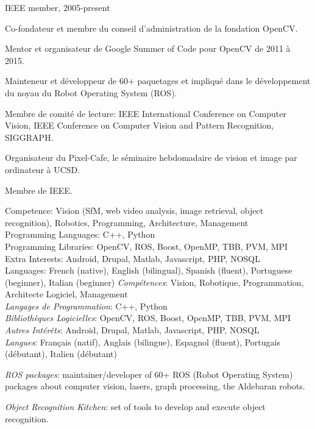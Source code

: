 \documentclass{article}
\begin{document}
\begin{llist}
{IEEE member, 2005-present
}
{

Co-fondateur et membre du conseil d'administration de la fondation OpenCV.

Mentor et organisateur de Google Summer of Code pour OpenCV de 2011 \`{a} 2015.

Mainteneur et d\'{e}veloppeur de 60+ paquetages et impliqu\'{e} dans le d\'{e}veloppement du
noyau du Robot Operating System (ROS).

Membre de comit\'{e} de lecture: IEEE International Conference on Computer Vision, IEEE Conference on Computer Vision 
and Pattern Recognition, SIGGRAPH.

Organisateur du Pixel-Cafe, le s\'{e}minaire hebdomadaire de vision et image par ordinateur \`{a} UCSD.

Membre de IEEE.
}

{
Competence: Vision (SfM, web video analysis, image retrieval, object recognition), Robotics, Programming, Architecture, 
Management \\
Programming Languages: C++, Python\\
Programming Libraries: OpenCV, ROS, Boost, OpenMP, TBB, PVM, MPI \\
Extra Interests: Android, Drupal, Matlab, Javascript, PHP, NOSQL \\
Languages: French (native), English (bilingual), Spanish (fluent), Portuguese (beginner), Italian (beginner)
}
{
{\em Comp\'{e}tences}: Vision, Robotique, Programmation, Architecte Logiciel, Management\\
{\em Langages de Programmation}: C++, Python\\
{\em Biblioth\`{e}ques Logicielles}: OpenCV, ROS, Boost, OpenMP, TBB, PVM, MPI \\
{\em Autres Int\'{e}r\^{e}ts}: Android, Drupal, Matlab, Javascript, PHP, NOSQL \\
{\em Langues}: Fran\c{c}ais (natif), Anglais (bilingue), Espagnol (fluent), Portugais (d\'{e}butant), Italien
(d\'{e}butant)
}

{
{\em ROS packages}: maintainer/developer of 60+ ROS (Robot Operating System) packages about computer vision, lasers, 
graph processing, the Aldebaran robots.

{\em Object Recognition Kitchen}: set of tools to develop and execute object recognition.

}
\end{llist}
\end{document}
